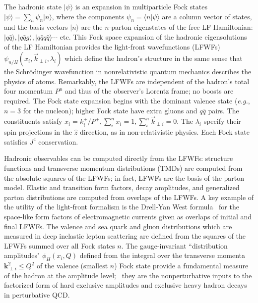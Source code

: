 \documentclass[prd,aps,onecolumn,nofootinbib]{revtex4}
\newcommand{\mbf}[1]{\mathbf{#1}}
\begin{document}
The hadronic state $\vert\psi\rangle$ is an expansion in multiparticle Fock states
$\vert \psi \rangle = \sum_n \psi_n \vert n \rangle$, where the components $\psi_n = \langle n \vert \psi \rangle$ are a column vector of states, and the basis vectors $\vert n \rangle$ are the $n$-parton eigenstates of the free LF Hamiltonian: 
$\vert q \bar q \rangle , \vert q \bar q g \rangle,   \vert q \bar q  q \bar q \rangle  \cdots$ etc.  
This Fock space expansion of the hadronic eigensolutions of the LF Hamiltonian 
provides the light-front wavefunctions (LFWFs) $\psi_{n/H}(x_i, \vec k_{\perp i}, \lambda_i) $ which define the hadron's structure in the same sense that the Schr\"odinger wavefunction in nonrelativistic quantum mechanics describes the physics of atoms.  Remarkably, the LFWFs are independent of the hadron's total four momentum  $P^\mu$ and thus of the observer's Lorentz frame;
no boosts are required.   
The Fock state expansion begins with the dominant valence state  ({\it e.g.}, $ n =3 $ for the nucleon); higher Fock state have extra gluons and $q \bar q$ pairs. The constituents satisfy $x_i = k^+_i/P^+, \sum^n_i x_i=1,  \sum^n_i \vec k_{\perp i} =0.$  The $\lambda_i$ specify their spin projections in the $\hat z$ direction, as in non-relativistic physics.  Each Fock state satisfies $J^z$ conservation.



Hadronic observables can be computed directly from the LFWFs: structure 
functions and transverse momentum distributions (TMDs) are computed from 
the absolute squares of the LFWFs; in fact, LFWFs are the basis of the 
parton model.  Elastic and transition form factors, decay amplitudes, and 
generalized parton distributions are computed from overlaps of the LFWFs. 
A key example of the utility of the light-front formalism is the Drell-Yan 
West formula~\cite{Drell:1969km,hep-th/9711200} for the space-like form 
factors of electromagnetic currents given as overlaps of initial and final 
LFWFs. The valence and sea quark and gluon distributions which are 
measured in deep inelastic lepton scattering are defined from the squares 
of the LFWFs summed over all Fock states $n$. The gauge-invariant 
``distribution amplitudes" $\phi_H(x_i,Q)$ defined from the integral over 
the transverse momenta $\mbf{k}^2_{\perp i} \le Q^2$ of the valence 
(smallest $n$) Fock state provide a fundamental measure of the hadron at 
the amplitude level;~\cite{arXiv:1012.3456,Efremov:1979qk} they are the 
nonperturbative inputs to the factorized form of hard exclusive amplitudes 
and exclusive heavy hadron decays in perturbative QCD.
\end{document}
